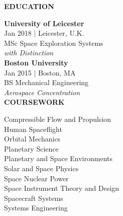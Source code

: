 \documentclass[10pt]{article}
\begin{document}
\begin{minipage}[t]{0.30\textwidth}


{\color{gray}
{\Large  \uppercase{\textbf{Education}} }\hspace{.1cm} \sout{\hfill} \\[-.2cm]    
}

{\large \sc \textbf{University of Leicester}} \\
{\color{gray} Jan 2018 $\vert$ Leicester, U.K.}\\
MSc Space Exploration Systems \\
\textit{with Distinction} \\

{\large \sc \textbf{Boston University}}\\ 
{\color{gray} Jan 2015 $\vert$ Boston, MA } \\
BS Mechanical Engineering \\
\textit{Aerospace Concentration}   \\[.25cm]

{\color{gray}
{\Large \uppercase{\textbf{Coursework}}} \hspace{.1cm} \sout{\hfill} \\[-.2cm]   
}

Compressible Flow and Propulsion\\
Human Spaceflight\\
Orbital Mechanics\\
Planetary Science\\
Planetary and Space Environments\\
Solar and Space Physics\\
Space Nuclear Power \\
Space Instrument Theory and Design\\
Spacecraft Systems\\
Systems Engineering\\


	

\end{minipage}
\end{document}
